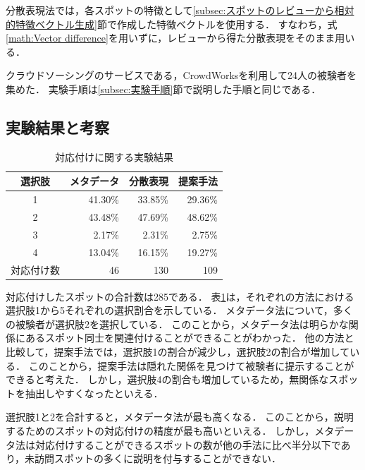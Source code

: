 \documentclass[submit]{ipsj}
\begin{document}
分散表現法では，各スポットの特徴として\ref{subsec:スポットのレビューから相対的特徴ベクトル生成}節で作成した特徴ベクトルを使用する．
すなわち，式\ref{math:Vector difference}を用いずに，レビューから得た分散表現をそのまま用いる．

クラウドソーシングのサービスである，CrowdWorksを利用して24人の被験者を集めた．
実験手順は\ref{subsec:実験手順}節で説明した手順と同じである．

\subsection{実験結果と考察}

\begin{table}[t]
  \caption{対応付けに関する実験結果}
  \label{table:対応付けに関する実験結果}
  \centering
  \begin{tabular}{c|r|r|r}
  \hline
  選択肢 & \multicolumn{1}{c|}{メタデータ} & \multicolumn{1}{c|}{分散表現} & \multicolumn{1}{c}{提案手法} \\ \hline
  1  & 41.30\%                    & 33.85\%                    & 29.36\% \\
  2  & 43.48\%                    & 47.69\%                    & 48.62\% \\
  3  & 2.17\%                     & 2.31\%                     & 2.75\% \\
  4  & 13.04\%                    & 16.15\%                    & 19.27\% \\
  \hline
  対応付け数  & 46                    & 130                    & 109 \\
   \hline
  \end{tabular}
\end{table}

対応付けしたスポットの合計数は285である．
表\ref{table:対応付けに関する実験結果}は，それぞれの方法における選択肢1から5それぞれの選択割合を示している．
メタデータ法について，多くの被験者が選択肢2を選択している．
このことから，メタデータ法は明らかな関係にあるスポット同士を関連付けることができることがわかった．
他の方法と比較して，提案手法では，選択肢1の割合が減少し，選択肢2の割合が増加している．
このことから，提案手法は隠れた関係を見つけて被験者に提示することができると考えた．
しかし，選択肢4の割合も増加しているため，無関係なスポットを抽出しやすくなったといえる．

選択肢1と2を合計すると，メタデータ法が最も高くなる．
このことから，説明するためのスポットの対応付けの精度が最も高いといえる．
しかし，メタデータ法は対応付けすることができるスポットの数が他の手法に比べ半分以下であり，未訪問スポットの多くに説明を付与することができない．
\end{document}
